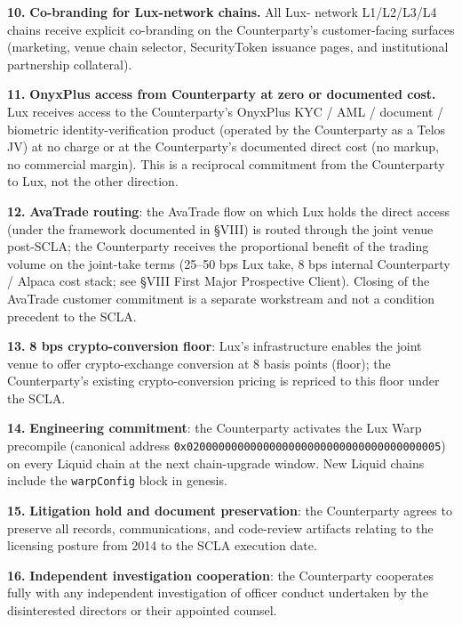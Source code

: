 \documentclass[11pt,letterpaper]{article}
\begin{document}
\textbf{10.} \textbf{Co-branding for Lux-network chains.} All Lux-
network L1/L2/L3/L4 chains receive explicit co-branding on the
Counterparty's customer-facing surfaces (marketing, venue chain
selector, SecurityToken issuance pages, and institutional partnership
collateral).

\textbf{11.} \textbf{OnyxPlus access from Counterparty at zero or
documented cost.} Lux receives access to the Counterparty's OnyxPlus
KYC / AML / document / biometric identity-verification product
(operated by the Counterparty as a Telos JV) at no charge or at the
Counterparty's documented direct cost (no markup, no commercial
margin). This is a reciprocal commitment from the Counterparty to
Lux, not the other direction.

\textbf{12.} \textbf{AvaTrade routing}: the AvaTrade flow on which
Lux holds the direct access (under the framework documented in
\S VIII) is routed through the joint venue post-SCLA; the
Counterparty receives the proportional benefit of the trading
volume on the joint-take terms (25--50 bps Lux take, 8 bps
internal Counterparty / Alpaca cost stack; see \S VIII First Major
Prospective Client). Closing of the AvaTrade customer commitment
is a separate workstream and not a condition precedent to the
SCLA.

\textbf{13.} \textbf{8 bps crypto-conversion floor}: Lux's
infrastructure enables the joint venue to offer crypto-exchange
conversion at 8 basis points (floor); the Counterparty's existing
crypto-conversion pricing is repriced to this floor under the SCLA.

\textbf{14.} \textbf{Engineering commitment}: the Counterparty
activates the Lux Warp precompile (canonical address
\texttt{0x0200000000000000000000000000000000000005}) on every Liquid
chain at the next chain-upgrade window. New Liquid chains include
the \texttt{warpConfig} block in genesis.

\textbf{15.} \textbf{Litigation hold and document preservation}: the
Counterparty agrees to preserve all records, communications, and
code-review artifacts relating to the licensing posture from 2014 to
the SCLA execution date.

\textbf{16.} \textbf{Independent investigation cooperation}: the
Counterparty cooperates fully with any independent investigation of
officer conduct undertaken by the disinterested directors or their
appointed counsel.
\end{document}
